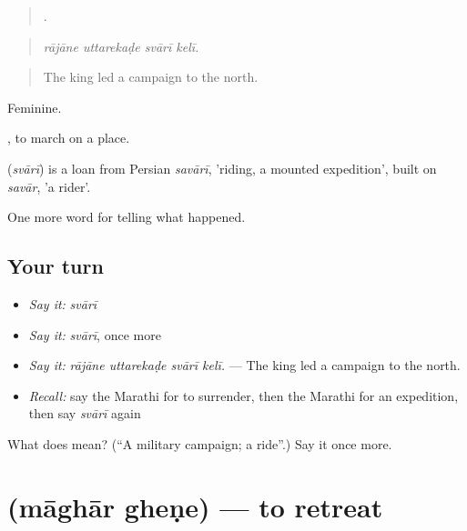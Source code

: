 \begin{quote}
   .
\end{quote}

\begin{quote}
\emph{rājāne uttarekaḍe svārī kelī.}
\end{quote}

\begin{quote}
The king led a campaign to the north.
\end{quote}

Feminine.

 , to march on a place.

\begin{cousinweb}
\textbf{} (\emph{svārī}) is a loan from Persian \emph{savārī}, 'riding, a mounted expedition', built on \emph{savār}, 'a rider'.
\end{cousinweb}

\begin{grammarlens}[title={What you've built}]
One more word for telling what happened.
\end{grammarlens}

\subsection*{Your turn}
\begin{itemize}
\raggedright
  \item \emph{Say it:} \emph{svārī}
  \item \emph{Say it:} \emph{svārī}, once more
  \item \emph{Say it:} \emph{rājāne uttarekaḍe svārī kelī.} — The king led a campaign to the north.
  \item \emph{Recall:} say the Marathi for to surrender, then the Marathi for an expedition, then say \emph{svārī} again
\end{itemize}

\begin{tcolorbox}[breakable,colback=teal!4,colframe=teal!35!black,title={Before you move on}]
What does  mean? (\textquotedblleft{}A military campaign; a ride\textquotedblright{}.) Say it once more.
\end{tcolorbox}
\section[\texorpdfstring{\mr{माघार} \mr{घेणे} (māghār gheṇe)}{माघार घेणे (māghār gheṇe)}]{  (māghār gheṇe) — to retreat}

